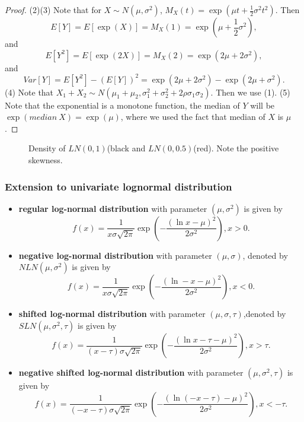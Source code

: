 \begin{refsection}
\begin{proof}
(2)(3)	
Note that for $X\sim N(\mu,\sigma^2)$, $M_X(t) = \exp(\mu t + \frac{1}{2}\sigma^2t^2)$. Then 
$$E[Y] = E[\exp(X)] = M_X(1) = \exp(\mu + \frac{1}{2}\sigma^2),$$
and
$$E[Y^2] = E[\exp(2X)] = M_X(2) = \exp(2\mu + 2\sigma^2),$$
and
$$Var[Y] = E[Y^2] - (E[Y])^2 =\exp(2\mu + 2\sigma^2) -  \exp(2\mu + \sigma^2). $$
(4) Note that $X_1 + X_2 \sim N(\mu_1+\mu_2, \sigma_1^2+\sigma_2^2 + 2\rho \sigma_1\sigma_2)$. Then we use (1).
(5) Note that the exponential is a monotone function, the median of $Y$ will be $\exp(median~X) = \exp(\mu)$, where we used the fact that median of $X$ is $\mu$.
\end{proof}


\begin{figure}[H]
\centering
{}
\caption{Density of $LN(0,1)$(black and $LN(0,0.5)$(red). Note the positive skewness.}
\end{figure}

\subsubsection{Extension to univariate lognormal distribution}

\begin{definition}\cite{borovkova2007closed}
\hfill
\begin{itemize}
	\item \textbf{regular log-normal distribution} with parameter $(\mu, \sigma^2)$ is given by
	$$f(x) = \frac{1}{x\sigma \sqrt{2\pi}}\exp(-\frac{(\ln x - \mu)^2}{2\sigma^2}),x>0.$$
	\item \textbf{negative log-normal distribution} with parameter $(\mu, \sigma)$, denoted by $NLN(\mu,\sigma^2)$ is given by
	$$f(x) = \frac{1}{x\sigma \sqrt{2\pi}}\exp(-\frac{(\ln -x - \mu)^2}{2\sigma^2}),x<0.$$
	\item \textbf{shifted log-normal distribution} with parameter $(\mu, \sigma,\tau)$,denoted by $SLN(\mu,\sigma^2,\tau)$ is given by
	$$f(x) = \frac{1}{(x-\tau)\sigma \sqrt{2\pi}}\exp(-\frac{(\ln x-\tau - \mu)^2}{2\sigma^2}),x>\tau.$$
	\item \textbf{negative shifted log-normal distribution} with parameter $(\mu, \sigma^2, \tau)$ is given by
	$$f(x) = \frac{1}{(-x-\tau)\sigma \sqrt{2\pi}}\exp(-\frac{(\ln (-x-\tau) - \mu)^2}{2\sigma^2}),x<-\tau.$$
\end{itemize}	
\end{definition}


\end{refsection}
